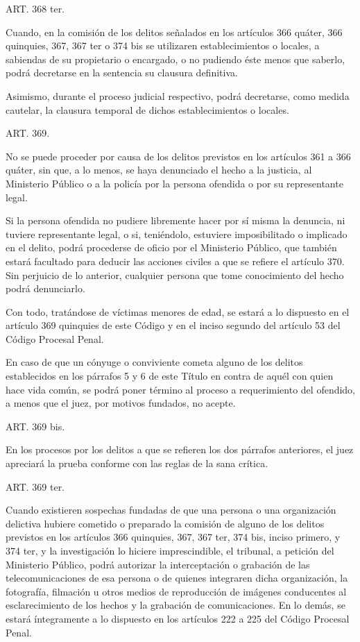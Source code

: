     ART. 368 ter.

    Cuando, en la comisión de los delitos señalados en los artículos 366 quáter, 366 quinquies, 367, 367 ter o 374 bis se utilizaren establecimientos o locales, a sabiendas de su propietario o encargado, o no pudiendo éste menos que saberlo, podrá decretarse en la sentencia su clausura definitiva.

    Asimismo, durante el proceso judicial respectivo, podrá decretarse, como medida cautelar, la clausura temporal de dichos establecimientos o locales.


    ART. 369.

    No se puede proceder por causa de los delitos previstos en los artículos 361 a 366 quáter, sin que, a lo menos, se haya denunciado el hecho a la justicia, al Ministerio Público o a la policía por la persona ofendida o por su representante legal.

    Si la persona ofendida no pudiere libremente hacer por sí misma la denuncia, ni tuviere representante legal, o si, teniéndolo, estuviere imposibilitado o implicado en el delito, podrá procederse de oficio por el Ministerio Público, que también estará facultado para deducir las acciones civiles a que se refiere el artículo 370. Sin perjuicio de lo anterior, cualquier persona que tome conocimiento del hecho podrá denunciarlo.

    Con todo, tratándose de víctimas menores de edad, se estará a lo dispuesto en el artículo 369 quinquies de este Código y en el inciso segundo del artículo 53 del Código Procesal Penal.

    En caso de que un cónyuge o conviviente cometa alguno de los delitos establecidos en los párrafos 5 y 6 de este Título en contra de aquél con quien hace vida común, se podrá poner término al proceso a requerimiento del ofendido, a menos que el juez, por motivos fundados, no acepte.



    ART. 369 bis.

    En los procesos por los delitos a que se refieren los dos párrafos anteriores, el juez apreciará la prueba conforme con las reglas de la sana crítica.

    ART. 369 ter.

    Cuando existieren sospechas fundadas de que una persona o una organización delictiva hubiere cometido o preparado la comisión de alguno de los delitos previstos en los artículos 366 quinquies, 367, 367 ter, 374 bis, inciso primero, y 374 ter, y la investigación lo hiciere imprescindible, el tribunal, a petición del Ministerio Público, podrá autorizar la interceptación o grabación de las telecomunicaciones de esa persona o de quienes integraren dicha organización, la fotografía, filmación u otros medios de reproducción de imágenes conducentes al esclarecimiento de los hechos y la grabación de comunicaciones. En lo demás, se estará íntegramente a lo dispuesto en los artículos 222 a 225 del Código Procesal Penal.

